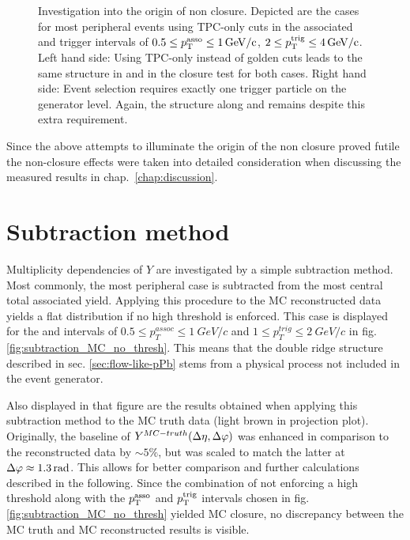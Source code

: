 \begin{figure}[htbp]
  \caption[Investigation into the origin of non closure by changing changing event selection criterion and track cuts.]{Investigation into the origin of non closure. Depicted are the cases for most peripheral events using TPC-only cuts in the associated and trigger intervals of $0.5 \le p_{\text{T}}^{\text{asso}} \le \SI{1}{GeV/c}$, $2 \le p_{\text{T}}^{\text{trig}} \le \SI{4}{GeV/c}$. Left hand side: Using \gls{TPC-only} instead of \gls{golden} cuts leads to the same structure in \deta and \dphi in the closure test for both cases. Right hand side: Event selection requires exactly one trigger particle on the generator level. Again, the structure along \deta and \dphi remains despite this extra requirement.}
  \label{fig:investigate_non_closure}
\end{figure}

Since the above attempts to illuminate the origin of the non closure proved futile the non-closure effects were taken into detailed consideration when discussing the measured results in chap.~\ref{chap:discussion}.

\section{Subtraction method}
\label{sec:subtraction}
Multiplicity dependencies of $Y$ are investigated by a simple subtraction method. Most commonly, the most peripheral case is subtracted from the most central total associated yield. Applying this procedure to the MC reconstructed data yields a flat distribution if no high \pt threshold is enforced. This case is displayed for the \ptassoc and \pttrig intervals of $0.5 \le p_T^{assoc} \le \SI{1}{GeV/c}$ and $1 \le p_T^{trig} \le \SI{2}{GeV/c}$ in fig. \ref{fig:subtraction_MC_no_thresh}.  This means that the double ridge structure described in sec. \ref{sec:flow-like-pPb} stems from a physical process not included in the event generator.

Also displayed in that figure are the results obtained when applying this subtraction method to the MC truth data (light brown in \dphi projection plot). Originally, the baseline of $Y^{MC-truth}(\Delta\eta, \Delta\varphi)$ was enhanced in comparison to the reconstructed data by $\sim5\%$, but was scaled to match the latter at $\Delta\varphi \approx \SI{1.3}{rad}$. This allows for better comparison and further calculations described in the following. Since the combination of not enforcing a high \pt threshold along with the  $p_{\text{T}}^{\text{asso}}$ and $p_{\text{T}}^{\text{trig}}$ intervals chosen in fig. \ref{fig:subtraction_MC_no_thresh} yielded MC closure, no discrepancy between the MC truth and MC reconstructed results is visible.


